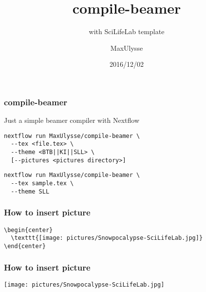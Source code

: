 \documentclass{beamer}
\title{compile-beamer}
\subtitle{with SciLifeLab template}
\author{MaxUlysse}
\institute{Barntumörbanken / SciLifeLab}
\date{2016/12/02}
\begin{document}
	\begin{frame}
		\titlepage
	\end{frame}

\begin{frame}[fragile]
	\frametitle{compile-beamer}
	Just a simple beamer compiler with Nextflow
	\begin{verbatim}
nextflow run MaxUlysse/compile-beamer \
  --tex <file.tex> \
  --theme <BTB||KI||SLL> \
  [--pictures <pictures directory>]
	\end{verbatim}
	\begin{verbatim}
nextflow run MaxUlysse/compile-beamer \
  --tex sample.tex \
  --theme SLL
	\end{verbatim}
\end{frame}

\begin{frame}[fragile]
	\frametitle{How to insert picture}
	\begin{verbatim}
\begin{center}
  \texttt{[image: pictures/Snowpocalypse-SciLifeLab.jpg]}
\end{center}
	\end{verbatim}
\end{frame}

	\begin{frame}
		\frametitle{How to insert picture}
		\begin{center}
			\texttt{[image: pictures/Snowpocalypse-SciLifeLab.jpg]}
		\end{center}
	\end{frame}
\end{document}
